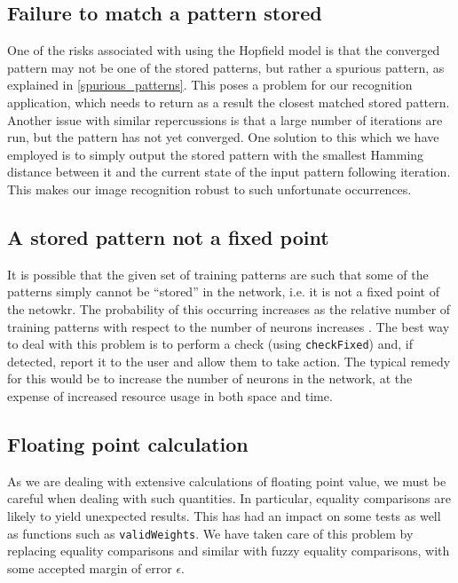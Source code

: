 \subsection{Failure to match a pattern stored}
One of the risks associated with using the Hopfield model is that the converged pattern may not be one of the stored patterns, but rather a spurious pattern, as explained in \ref{spurious_patterns}. This poses a problem for our recognition application, which needs to return as a result the closest matched stored pattern. Another issue with similar repercussions is that a large number of iterations are run, but the pattern has not yet converged.
One solution to this which we have employed  is to simply output the stored pattern with the smallest Hamming distance between it and the current state of the input pattern following iteration. This makes our image recognition robust to such unfortunate occurrences.


\subsection{A stored pattern not a fixed point}
It is possible that the given set of training patterns are such that some of the patterns simply cannot be ``stored'' in the network, i.e. it is not a fixed point of the netowkr. The probability of this occurring increases as the relative number of training patterns with respect to the number of neurons increases .
The best way to deal with this problem is to perform a check (using \texttt{checkFixed})  and, if detected, report it  to the user and allow them to take action. The typical remedy for this would be to increase the number of neurons in the network, at the expense of increased resource usage in both space and time.


\subsection{Floating point calculation}
As we are dealing with extensive calculations of floating point value, we must be careful when dealing with such quantities. In particular, equality comparisons are likely to yield unexpected results. This has had an impact on some tests as well as functions such as \texttt{validWeights}. We have taken care of this problem by replacing equality comparisons and similar with fuzzy equality comparisons, with some accepted margin of error $\epsilon$.
